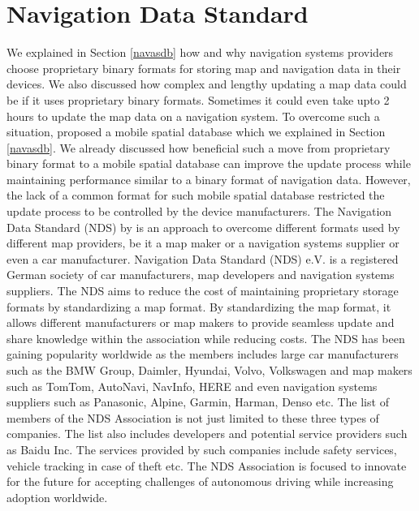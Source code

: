 \section{Navigation Data Standard} \label{nds}
We explained in Section \ref{navasdb} how and why navigation systems providers choose proprietary binary formats for storing map and navigation data in their devices. 
We also discussed how complex and lengthy updating a map data could be if it uses proprietary binary formats. 
Sometimes it could even take upto 2 hours to update the map data on a navigation system. 
To overcome such a situation, \citet{min2008mobile} proposed a mobile spatial database which we explained in Section \ref{navasdb}. 
We already discussed how beneficial such a move from proprietary binary format to a mobile spatial database can improve the update process while maintaining performance similar to a binary format of navigation data. 
However, the lack of a common format for such mobile spatial database restricted the update process to be controlled by the device manufacturers. 
The Navigation Data Standard (NDS) by \citet{muller2010navigation} is an approach to overcome different formats used by different map providers, be it a map maker or a navigation systems supplier or even a car manufacturer. 
Navigation Data Standard (NDS) e.V. is a registered German society of car manufacturers, map developers and navigation systems suppliers. 
The NDS aims to reduce the cost of maintaining proprietary storage formats by standardizing a map format. 
By standardizing the map format, it allows different manufacturers or map makers to provide seamless update and share knowledge within the association while reducing costs. 
The NDS has been gaining popularity worldwide as the members includes large car manufacturers such as the BMW Group, Daimler, Hyundai, Volvo, Volkswagen and map makers such as TomTom, AutoNavi, NavInfo, HERE and even navigation systems suppliers such as Panasonic, Alpine, Garmin, Harman, Denso etc. 
The list of members of the NDS Association is not just limited to these three types of companies. 
The list also includes developers and potential service providers such as Baidu Inc. The services provided by such companies include safety services, vehicle tracking in case of theft etc.   
The NDS Association is focused to innovate for the future for accepting challenges of autonomous driving while increasing adoption worldwide.\\

